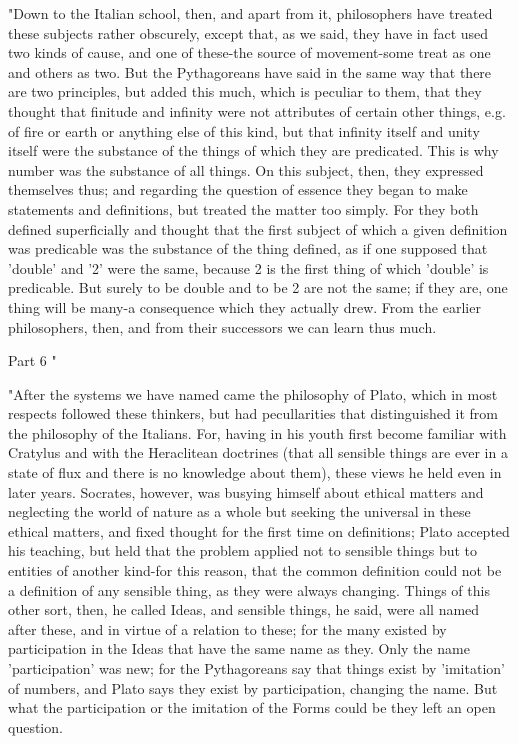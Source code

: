 "Down to the Italian school, then, and apart from it, philosophers
have treated these subjects rather obscurely, except that, as we said,
they have in fact used two kinds of cause, and one of these-the source
of movement-some treat as one and others as two. But the Pythagoreans
have said in the same way that there are two principles, but added
this much, which is peculiar to them, that they thought that finitude
and infinity were not attributes of certain other things, e.g. of
fire or earth or anything else of this kind, but that infinity itself
and unity itself were the substance of the things of which they are
predicated. This is why number was the substance of all things. On
this subject, then, they expressed themselves thus; and regarding
the question of essence they began to make statements and definitions,
but treated the matter too simply. For they both defined superficially
and thought that the first subject of which a given definition was
predicable was the substance of the thing defined, as if one supposed
that 'double' and '2' were the same, because 2 is the first thing
of which 'double' is predicable. But surely to be double and to be
2 are not the same; if they are, one thing will be many-a consequence
which they actually drew. From the earlier philosophers, then, and
from their successors we can learn thus much. 

Part 6 "

"After the systems we have named came the philosophy of Plato, which
in most respects followed these thinkers, but had pecullarities that
distinguished it from the philosophy of the Italians. For, having
in his youth first become familiar with Cratylus and with the Heraclitean
doctrines (that all sensible things are ever in a state of flux and
there is no knowledge about them), these views he held even in later
years. Socrates, however, was busying himself about ethical matters
and neglecting the world of nature as a whole but seeking the universal
in these ethical matters, and fixed thought for the first time on
definitions; Plato accepted his teaching, but held that the problem
applied not to sensible things but to entities of another kind-for
this reason, that the common definition could not be a definition
of any sensible thing, as they were always changing. Things of this
other sort, then, he called Ideas, and sensible things, he said, were
all named after these, and in virtue of a relation to these; for the
many existed by participation in the Ideas that have the same name
as they. Only the name 'participation' was new; for the Pythagoreans
say that things exist by 'imitation' of numbers, and Plato says they
exist by participation, changing the name. But what the participation
or the imitation of the Forms could be they left an open question.

